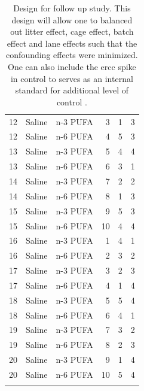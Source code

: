 \documentclass[12pt]{scrbook}
\begin{document}
\begin{center}
\begin{longtable}[H]{rrrrrr}
		12    & Saline & n-3 PUFA & 3     & 1     & 3 \\
		12    & Saline & n-6 PUFA & 4     & 5     & 3 \\
		13    & Saline & n-3 PUFA & 5     & 4     & 4 \\
		13    & Saline & n-6 PUFA & 6     & 3     & 1 \\
		14    & Saline & n-3 PUFA & 7     & 2     & 2 \\
		14    & Saline & n-6 PUFA & 8     & 1     & 3 \\
		15    & Saline & n-3 PUFA & 9     & 5     & 3 \\
		15    & Saline & n-6 PUFA & 10    & 4     & 4 \\
		16    & Saline & n-3 PUFA & 1     & 4     & 1 \\
		16    & Saline & n-6 PUFA & 2     & 3     & 2 \\
		17    & Saline & n-3 PUFA & 3     & 2     & 3 \\
		17    & Saline & n-6 PUFA & 4     & 1     & 4 \\
		18    & Saline & n-3 PUFA & 5     & 5     & 4 \\
		18    & Saline & n-6 PUFA & 6     & 4     & 1 \\
		19    & Saline & n-3 PUFA & 7     & 3     & 2 \\
		19    & Saline & n-6 PUFA & 8     & 2     & 3 \\
		20    & Saline & n-3 PUFA & 9     & 1     & 4 \\
		20    & Saline & n-6 PUFA & 10    & 5     & 4 \\
		\bottomrule
		\caption[Design for Follow Up Study]{
			Design for follow up study.
			This design will allow one to balanced out litter effect, cage effect, batch effect and lane effects such that the confounding effects were minimized.
			One can also include the \gls{ercc} spike in control to serves as an internal standard for additional level of control \citep{Jiang2011a}.
		}
		\label{tab:bestdesign}%
	\end{longtable}%
\end{center}
\end{document}
